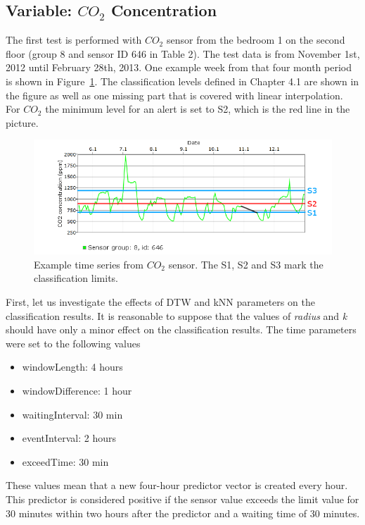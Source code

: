 \subsection*{Variable: $CO_2$ Concentration}
The first test is performed with $CO_2$ sensor from the bedroom 1 on the second floor (group 8 and sensor ID 646 in Table 2). The test data is from November 1st, 2012 until February 28th, 2013. One example week from that four month period is shown in Figure~\ref{fig:co2_1}. The classification levels defined in Chapter 4.1 are shown in the figure as well as one missing part that is covered with linear interpolation. For $CO_2$ the minimum level for an alert is set to S2, which is the red line in the picture.

\begin{center}
\begin{figure}[h!]
\includegraphics[scale=0.7]{images/co2_1.png}
\caption{Example time series from $CO_2$ sensor. The S1, S2 and S3 mark the classification limits.}
\label{fig:co2_1}
\end{figure}
\end{center}

First, let us investigate the effects of DTW and kNN parameters on the classification results. It is reasonable to suppose that the values of \emph{radius} and \emph{k} should have only a minor effect on the classification results. The time parameters were set to the following values
\begin{itemize}
\item{windowLength: 4 hours}
\item{windowDifference: 1 hour}
\item{waitingInterval: 30 min}
\item{eventInterval: 2 hours}
\item{exceedTime: 30 min}
\end{itemize}

These values mean that a new four-hour predictor vector is created every hour. This predictor is considered positive if the sensor value exceeds the limit value for 30 minutes within two hours after the predictor and a waiting time of 30 minutes.

